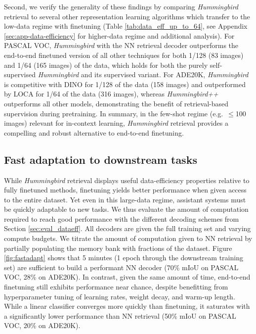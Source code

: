 \documentclass{article}
\newcommand{\ours}{\textit{Hummingbird} }
\newcommand{\oursup}{\textit{Hummingbird}\textit{++} }
\begin{document}
Second, we verify the generality of these findings by comparing \ours retrieval to several other representation learning algorithms which transfer to the low-data regime with finetuning (Table \ref{tab:data_eff_up_to_64}, see Appendix \ref{sec:app-data-efficiency} for higher-data regime and additional analysis). For PASCAL VOC, \ours with the NN retrieval decoder outperforms the end-to-end finetuned version of all other techniques for both 1/128 (83 images) and 1/64 (165 images) of the data, which holds for both the purely self-supervised \ours and its supervised variant. For ADE20K, \ours is competitive with DINO \cite{caron2021emerging} for 1/128 of the data (158 images) and outperformed by LOCA for 1/64 of the data (316 images), whereas \oursup outperforms all other models, demonstrating the benefit of retrieval-based supervision during pretraining.
In summary, in the few-shot regime (e.g.\ $\leq$100 images) relevant for in-context learning, \ours retrieval provides a compelling and robust alternative to end-to-end finetuning.




\subsection{Fast adaptation to downstream tasks} \label{sec:eval_fastadapt}


While \ours retrieval displays useful data-efficiency properties relative to fully finetuned methods, finetuning yields better performance when given access to the entire dataset. Yet even in this large-data regime, assistant systems must be quickly adaptable to new tasks. We thus evaluate the amount of computation required to reach good performance with the different decoding schemes from Section \ref{sec:eval_dataeff}. 
All decoders are given the full training set and varying compute budgets. We titrate the amount of computation given to NN retrieval by partially populating the memory bank with fractions of the dataset. Figure \ref{fig:fastadapt} shows that 5 minutes (1 epoch through the downstream training set) are sufficient to build a performant NN decoder (70\% mIoU on PASCAL VOC, 28\% on ADE20K). In contrast, given the same amount of time, end-to-end finetuning still exhibits performance near chance, despite benefitting from hyperparameter tuning of learning rates, weight decay, and warm-up length. While a linear classifier converges more quickly than finetuning, it saturates with a significantly lower performance than NN retrieval (50\% mIoU on PASCAL VOC, 20\% on ADE20K). 
\end{document}
